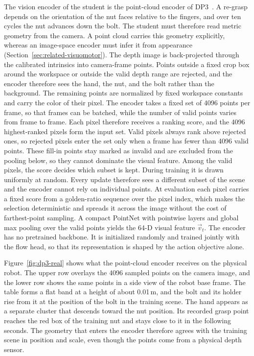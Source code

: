 The vision encoder of the student is the point-cloud encoder of \ac{DP3}~\cite{Ze2024}. A re-grasp depends on the orientation of the nut faces relative to the fingers, and over ten cycles the nut advances down the bolt. The student must therefore read metric geometry from the camera. A point cloud carries this geometry explicitly, whereas an image-space encoder must infer it from appearance (Section~\ref{sec:related-visuomotor}). The depth image is back-projected through the calibrated intrinsics into camera-frame points. Points outside a fixed crop box around the workspace or outside the valid depth range are rejected, and the encoder therefore sees the hand, the nut, and the bolt rather than the background. The remaining points are normalized by fixed workspace constants and carry the color of their pixel. The encoder takes a fixed set of 4096 points per frame, so that frames can be batched, while the number of valid points varies from frame to frame. Each pixel therefore receives a ranking score, and the 4096 highest-ranked pixels form the input set. Valid pixels always rank above rejected ones, so rejected pixels enter the set only when a frame has fewer than 4096 valid points. These fill-in points stay marked as invalid and are excluded from the pooling below, so they cannot dominate the visual feature. Among the valid pixels, the score decides which subset is kept. During training it is drawn uniformly at random. Every update therefore sees a different subset of the scene and the encoder cannot rely on individual points. At evaluation each pixel carries a fixed score from a golden-ratio sequence over the pixel index, which makes the selection deterministic and spreads it across the image without the cost of farthest-point sampling. A compact PointNet with pointwise layers and global max pooling over the valid points yields the 64-D visual feature $\vec{v}_t$. The encoder has no pretrained backbone. It is initialized randomly and trained jointly with the flow head, so that its representation is shaped by the action objective alone.

Figure~\ref{fig:dp3-real} shows what the point-cloud encoder receives on the physical robot. The upper row overlays the 4096 sampled points on the camera image, and the lower row shows the same points in a side view of the robot base frame. The table forms a flat band at a height of about 0.01\,m, and the bolt and its holder rise from it at the position of the bolt in the training scene. The hand appears as a separate cluster that descends toward the nut position. Its recorded grasp point reaches the red box of the training nut and stays close to it in the following seconds. The geometry that enters the encoder therefore agrees with the training scene in position and scale, even though the points come from a physical depth sensor.

